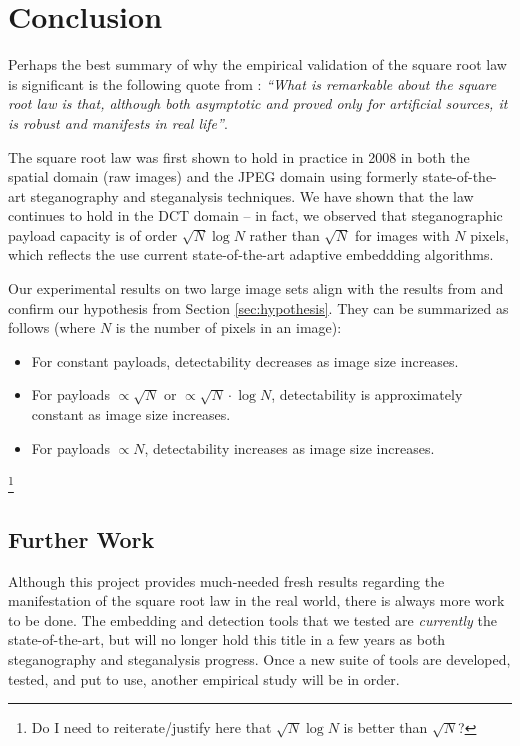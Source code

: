 \documentclass[11pt,a4paper,twoside,openright]{report}
\begin{document}
\chapter{Conclusion}

Perhaps the best summary of why the empirical validation of the square root law is significant is the following quote from \cite{laboratory-to-real-world}: \textit{``What is remarkable about the square root law is that, although both asymptotic and proved only for artificial sources, it is robust and manifests in real life''}.

The square root law was first shown to hold in practice in 2008 \cite{2008-paper} in both the spatial domain (raw images) and the JPEG domain using formerly state-of-the-art steganography and steganalysis techniques. We have shown that the law continues to hold in the DCT domain -- in fact, we observed that steganographic payload capacity is of order $\sqrt{N} \log{N}$ rather than $\sqrt{N}$ for images with $N$ pixels, which reflects the use current state-of-the-art adaptive embeddding algorithms.

Our experimental results on two large image sets align with the results from \cite{2008-paper} and confirm our hypothesis from Section \ref{sec:hypothesis}. They can be summarized as follows (where $N$ is the number of pixels in an image):
\begin{itemize}
	\item For constant payloads, detectability decreases as image size increases.
	\item For payloads $\propto \sqrt{N}$ or $\propto \sqrt{N} \cdot \log{N}$, detectability is approximately constant as image size increases.
	\item For payloads $\propto N$, detectability increases as image size increases.
\end{itemize}

\footnote{Do I need to reiterate/justify here that $\sqrt{N}\log{N}$ is better than $\sqrt{N}$?}


\section{Further Work}

Although this project provides much-needed fresh results regarding the manifestation of the square root law in the real world, there is always more work to be done. The embedding and detection tools that we tested are \textit{currently} the state-of-the-art, but will no longer hold this title in a few years as both steganography and steganalysis progress. Once a new suite of tools are developed, tested, and put to use, another empirical study will be in order.
\end{document}
